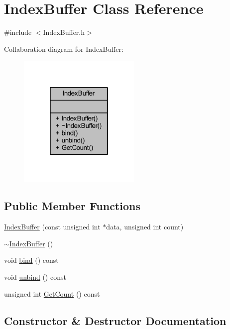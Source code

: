 \hypertarget{class_index_buffer}{}\section{Index\+Buffer Class Reference}
\label{class_index_buffer}


{\ttfamily \#include $<$Index\+Buffer.\+h$>$}



Collaboration diagram for Index\+Buffer\+:
\nopagebreak
\begin{figure}[H]
\begin{center}
\leavevmode
\includegraphics[width=166pt]{class_index_buffer__coll__graph}
\end{center}
\end{figure}
\subsection*{Public Member Functions}
\begin{DoxyCompactItemize}
\item 
\mbox{\hyperlink{class_index_buffer_aa62b83970f954463fe7bf1e4954c3177}{Index\+Buffer}} (const unsigned int $\ast$data, unsigned int count)
\item 
\mbox{\hyperlink{class_index_buffer_a348889936f378b7942c1e01d83e42866}{$\sim$\+Index\+Buffer}} ()
\item 
void \mbox{\hyperlink{class_index_buffer_ae9d8b583fd99e86874cc8c46f2ed1c17}{bind}} () const
\item 
void \mbox{\hyperlink{class_index_buffer_a29815a01631f16261b0c7e1b9a6959ea}{unbind}} () const
\item 
unsigned int \mbox{\hyperlink{class_index_buffer_a3ec4dba9cc97dfedac07d6375d25b3b6}{Get\+Count}} () const
\end{DoxyCompactItemize}


\subsection{Constructor \& Destructor Documentation}
\mbox{\label{class_index_buffer_aa62b83970f954463fe7bf1e4954c3177}} 
